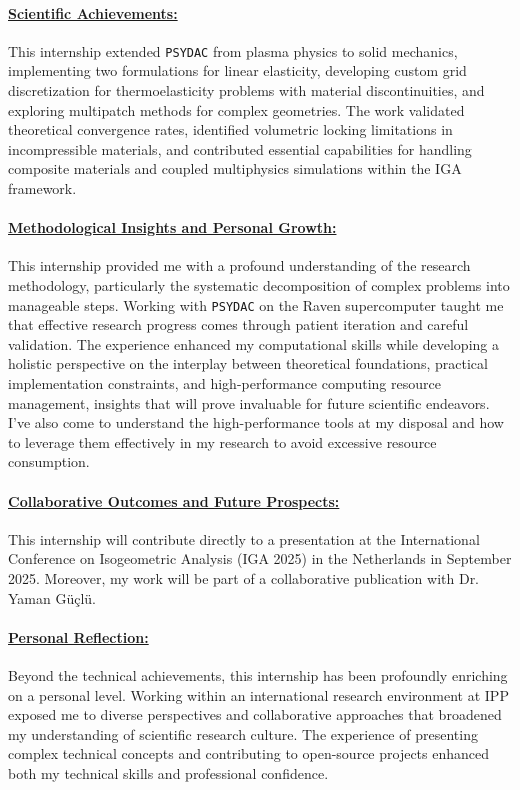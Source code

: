 \documentclass[a4paper,12pt,twoside]{report}
\begin{document}
\paragraph{\underline{Scientific Achievements:}}
This internship extended \texttt{PSYDAC} from plasma physics to solid mechanics, implementing two formulations for linear elasticity, developing custom grid discretization for thermoelasticity problems with material discontinuities, and exploring multipatch methods for complex geometries. The work validated theoretical convergence rates, identified volumetric locking limitations in incompressible materials, and contributed essential capabilities for handling composite materials and coupled multiphysics simulations within the IGA framework.

\paragraph{\underline{Methodological Insights and Personal Growth:}}

This internship provided me with a profound understanding of the research methodology, particularly the systematic decomposition of complex problems into manageable steps. Working with \texttt{PSYDAC} on the Raven supercomputer taught me that effective research progress comes through patient iteration and careful validation. The experience enhanced my computational skills while developing a holistic perspective on the interplay between theoretical foundations, practical implementation constraints, and high-performance computing resource management, insights that will prove invaluable for future scientific endeavors. I've also come to understand the high-performance tools at my disposal and how to leverage them effectively in my research to avoid excessive resource consumption.

\paragraph{\underline{Collaborative Outcomes and Future Prospects:}}

This internship will contribute directly to a presentation at the International Conference on Isogeometric Analysis (IGA 2025) in the Netherlands in September 2025. Moreover, my work will be part of a collaborative publication with Dr. Yaman Güçlü.

\paragraph{\underline{Personal Reflection:}}
Beyond the technical achievements, this internship has been profoundly enriching on a personal level. Working within an international research environment at IPP exposed me to diverse perspectives and collaborative approaches that broadened my understanding of scientific research culture. The experience of presenting complex technical concepts and contributing to open-source projects enhanced both my technical skills and professional confidence.
\end{document}
